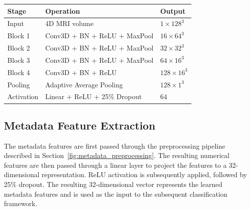 \documentclass[10pt,twocolumn]{article}
\begin{document}
        \begin{table}[H]
            \centering
            \renewcommand{\arraystretch}{1.15}
            \setlength{\tabcolsep}{4pt}
            \small

            \begin{tabular}{p{1.8cm} p{4.5cm} p{1.55cm}}
                \hline
                \textbf{Stage} & \textbf{Operation} & \textbf{Output} \\
                \hline
                Input
                & 4D MRI volume
                & $1\times128^3$ \\

                Block 1
                & Conv3D + BN + ReLU + MaxPool
                & $16\times64^3$ \\

                Block 2
                & Conv3D + BN + ReLU + MaxPool
                & $32\times32^3$ \\

                Block 3
                & Conv3D + BN + ReLU + MaxPool
                & $64\times16^3$ \\

                Block 4
                & Conv3D + BN + ReLU
                & $128\times16^3$ \\

                Pooling
                & Adaptive Average Pooling
                & $128\times1^3$ \\

                Activation
                & Linear + ReLU + 25\% Dropout
                & $64$ \\

                \hline
            \end{tabular}
        \end{table}
   
    
    \subsection{Metadata Feature Extraction}
        The metadata features are first passed through the preprocessing pipeline described in Section~\ref{fig:metadata_preprocessing}. The resulting numerical features are then passed through a linear layer to project the features to a 32-dimensional representation. ReLU activation is subsequently applied, followed by 25\% dropout. The resulting 32-dimensional vector represents the learned metadata features and is used as the input to the subsequent classification framework.
    
\end{document}
